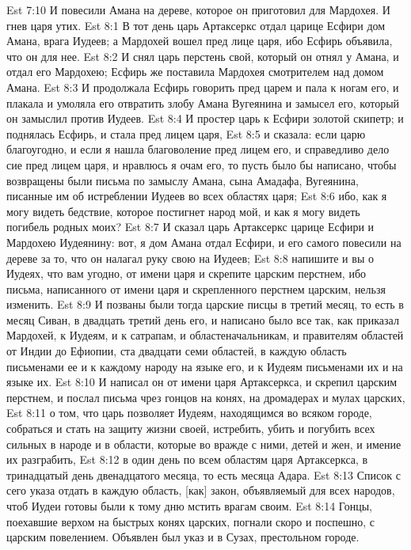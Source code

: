 Est 7:10  И повесили Амана на дереве, которое он приготовил для Мардохея. И гнев царя утих.
Est 8:1  В тот день царь Артаксеркс отдал царице Есфири дом Амана, врага Иудеев; а Мардохей вошел пред лице царя, ибо Есфирь объявила, что он для нее.
Est 8:2  И снял царь перстень свой, который он отнял у Амана, и отдал его Мардохею; Есфирь же поставила Мардохея смотрителем над домом Амана.
Est 8:3  И продолжала Есфирь говорить пред царем и пала к ногам его, и плакала и умоляла его отвратить злобу Амана Вугеянина и замысел его, который он замыслил против Иудеев.
Est 8:4  И простер царь к Есфири золотой скипетр; и поднялась Есфирь, и стала пред лицем царя,
Est 8:5  и сказала: если царю благоугодно, и если я нашла благоволение пред лицем его, и справедливо дело сие пред лицем царя, и нравлюсь я очам его, то пусть было бы написано, чтобы возвращены были письма по замыслу Амана, сына Амадафа, Вугеянина, писанные им об истреблении Иудеев во всех областях царя;
Est 8:6  ибо, как я могу видеть бедствие, которое постигнет народ мой, и как я могу видеть погибель родных моих?
Est 8:7  И сказал царь Артаксеркс царице Есфири и Мардохею Иудеянину: вот, я дом Амана отдал Есфири, и его самого повесили на дереве за то, что он налагал руку свою на Иудеев;
Est 8:8  напишите и вы о Иудеях, что вам угодно, от имени царя и скрепите царским перстнем, ибо письма, написанного от имени царя и скрепленного перстнем царским, нельзя изменить.
Est 8:9  И позваны были тогда царские писцы в третий месяц, то есть в месяц Сиван, в двадцать третий день его, и написано было все так, как приказал Мардохей, к Иудеям, и к сатрапам, и областеначальникам, и правителям областей от Индии до Ефиопии, ста двадцати семи областей, в каждую область письменами ее и к каждому народу на языке его, и к Иудеям письменами их и на языке их.
Est 8:10  И написал он от имени царя Артаксеркса, и скрепил царским перстнем, и послал письма чрез гонцов на конях, на дромадерах и мулах царских,
Est 8:11  о том, что царь позволяет Иудеям, находящимся во всяком городе, собраться и стать на защиту жизни своей, истребить, убить и погубить всех сильных в народе и в области, которые во вражде с ними, детей и жен, и имение их разграбить,
Est 8:12  в один день по всем областям царя Артаксеркса, в тринадцатый день двенадцатого месяца, то есть месяца Адара.
Est 8:13  Список с сего указа отдать в каждую область, [как] закон, объявляемый для всех народов, чтоб Иудеи готовы были к тому дню мстить врагам своим.
Est 8:14  Гонцы, поехавшие верхом на быстрых конях царских, погнали скоро и поспешно, с царским повелением. Объявлен был указ и в Сузах, престольном городе.
